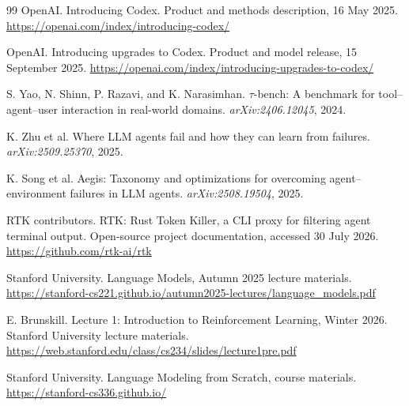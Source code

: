 \documentclass[11pt,a4paper]{article}
\begin{document}
\begin{thebibliography}{99}
OpenAI.
\newblock Introducing Codex.
\newblock Product and methods description, 16 May 2025. \url{https://openai.com/index/introducing-codex/}

OpenAI.
\newblock Introducing upgrades to Codex.
\newblock Product and model release, 15 September 2025. \url{https://openai.com/index/introducing-upgrades-to-codex/}

S. Yao, N. Shinn, P. Razavi, and K. Narasimhan.
\newblock $\tau$-bench: A benchmark for tool--agent--user interaction in real-world domains.
\newblock \emph{arXiv:2406.12045}, 2024.

K. Zhu et al.
\newblock Where LLM agents fail and how they can learn from failures.
\newblock \emph{arXiv:2509.25370}, 2025.

K. Song et al.
\newblock Aegis: Taxonomy and optimizations for overcoming agent--environment failures in LLM agents.
\newblock \emph{arXiv:2508.19504}, 2025.

RTK contributors.
\newblock RTK: Rust Token Killer, a CLI proxy for filtering agent terminal output.
\newblock Open-source project documentation, accessed 30 July 2026. \url{https://github.com/rtk-ai/rtk}

Stanford University.
\newblock Language Models, Autumn 2025 lecture materials.
\newblock \url{https://stanford-cs221.github.io/autumn2025-lectures/language_models.pdf}

E. Brunskill.
\newblock Lecture 1: Introduction to Reinforcement Learning, Winter 2026.
\newblock Stanford University lecture materials. \url{https://web.stanford.edu/class/cs234/slides/lecture1pre.pdf}

Stanford University.
\newblock Language Modeling from Scratch, course materials.
\newblock \url{https://stanford-cs336.github.io/}

\end{thebibliography}
\end{document}
